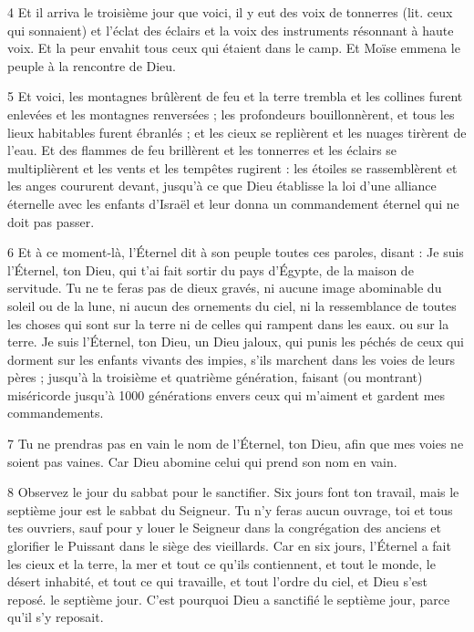 \par 4 Et il arriva le troisième jour que voici, il y eut des voix de tonnerres (lit. ceux qui sonnaient) et l'éclat des éclairs et la voix des instruments résonnant à haute voix. Et la peur envahit tous ceux qui étaient dans le camp. Et Moïse emmena le peuple à la rencontre de Dieu.

\par 5 Et voici, les montagnes brûlèrent de feu et la terre trembla et les collines furent enlevées et les montagnes renversées ; les profondeurs bouillonnèrent, et tous les lieux habitables furent ébranlés ; et les cieux se replièrent et les nuages ​​tirèrent de l'eau. Et des flammes de feu brillèrent et les tonnerres et les éclairs se multiplièrent et les vents et les tempêtes rugirent : les étoiles se rassemblèrent et les anges coururent devant, jusqu'à ce que Dieu établisse la loi d'une alliance éternelle avec les enfants d'Israël et leur donna un commandement éternel qui ne doit pas passer.

\par 6 Et à ce moment-là, l'Éternel dit à son peuple toutes ces paroles, disant : Je suis l'Éternel, ton Dieu, qui t'ai fait sortir du pays d'Égypte, de la maison de servitude. Tu ne te feras pas de dieux gravés, ni aucune image abominable du soleil ou de la lune, ni aucun des ornements du ciel, ni la ressemblance de toutes les choses qui sont sur la terre ni de celles qui rampent dans les eaux. ou sur la terre. Je suis l'Éternel, ton Dieu, un Dieu jaloux, qui punis les péchés de ceux qui dorment sur les enfants vivants des impies, s'ils marchent dans les voies de leurs pères ; jusqu'à la troisième et quatrième génération, faisant (ou montrant) miséricorde jusqu'à 1000 générations envers ceux qui m'aiment et gardent mes commandements.

\par 7 Tu ne prendras pas en vain le nom de l'Éternel, ton Dieu, afin que mes voies ne soient pas vaines. Car Dieu abomine celui qui prend son nom en vain.

\par 8 Observez le jour du sabbat pour le sanctifier. Six jours font ton travail, mais le septième jour est le sabbat du Seigneur. Tu n'y feras aucun ouvrage, toi et tous tes ouvriers, sauf pour y louer le Seigneur dans la congrégation des anciens et glorifier le Puissant dans le siège des vieillards. Car en six jours, l'Éternel a fait les cieux et la terre, la mer et tout ce qu'ils contiennent, et tout le monde, le désert inhabité, et tout ce qui travaille, et tout l'ordre du ciel, et Dieu s'est reposé. le septième jour. C'est pourquoi Dieu a sanctifié le septième jour, parce qu'il s'y reposait.


